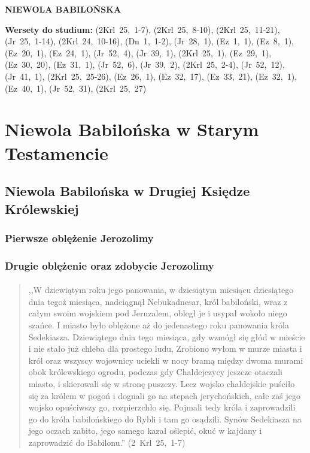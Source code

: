 \documentclass[10pt,a4paper,oneside]{article}
\begin{document}
\centerline{\textbf{\MakeUppercase{Niewola Babilońska}}}
\begin{center}
\textbf{Wersety do studium:} 
\mbox{(2Krl 25, 1-7)}, \mbox{(2Krl 25, 8-10)}, \mbox{(2Krl 25, 11-21)}, \mbox{(Jr 25, 1-14)}, \mbox{(2Krl 24, 10-16)}, \mbox{(Dn 1, 1-2)}, \mbox{(Jr 28, 1)}, \mbox{(Ez 1, 1)}, \mbox{(Ez 8, 1)}, \mbox{(Ez 20, 1)}, \mbox{(Ez 24, 1)}, \mbox{(Jr 52, 4)}, \mbox{(Jr 39, 1)}, \mbox{(2Krl 25, 1)}, \mbox{(Ez 29, 1)}, \mbox{(Ez 30, 20)}, \mbox{(Ez 31, 1)}, \mbox{(Jr 52, 6)}, \mbox{(Jr 39, 2)}, \mbox{(2Krl 25, 2-4)}, \mbox{(Jr 52, 12)}, \mbox{(Jr 41, 1)}, \mbox{(2Krl 25, 25-26)}, \mbox{(Ez 26, 1)}, \mbox{(Ez 32, 17)}, \mbox{(Ez 33, 21)}, \mbox{(Ez 32, 1)}, \mbox{(Ez 40, 1)}, \mbox{(Jr 52, 31)}, \mbox{(2Krl 25, 27)}
\end{center}
\section{Niewola Babilońska w Starym Testamencie}
\subsection{Niewola Babilońska w Drugiej Księdze Królewskiej}
\subsubsection{Pierwsze oblężenie Jerozolimy}
\subsubsection{Drugie oblężenie oraz zdobycie Jerozolimy}
\paragraph{}
\begin{quote}
,,W dziewiątym roku jego panowania, w dziesiątym miesiącu dziesiątego dnia tegoż miesiąca, nadciągnął Nebukadnesar, król babiloński, wraz z całym swoim wojskiem pod Jeruzalem, obległ je i usypał wokoło niego szańce. I miasto było oblężone aż do jedenastego roku panowania króla Sedekiasza. Dziewiątego dnia tego miesiąca, gdy wzmógł się głód w mieście i nie stało już chleba dla prostego ludu, Zrobiono wyłom w murze miasta i król oraz wszyscy wojownicy uciekli w nocy bramą między dwoma murami obok królewskiego ogrodu, podczas gdy Chaldejczycy jeszcze otaczali miasto, i skierowali się w stronę puszczy. Lecz wojsko chaldejskie puściło się za królem w pogoń i dognali go na stepach jerychońskich, całe zaś jego wojsko opuściwszy go, rozpierzchło się. Pojmali tedy króla i zaprowadzili go do króla babilońskiego do Rybli i tam go osądzili. Synów Sedekiasza na jego oczach zabito, jego samego kazał oślepić, okuć w kajdany i zaprowadzić do Babilonu.'' \mbox{(2 Krl 25, 1-7)}
\end{quote}
\end{document}
